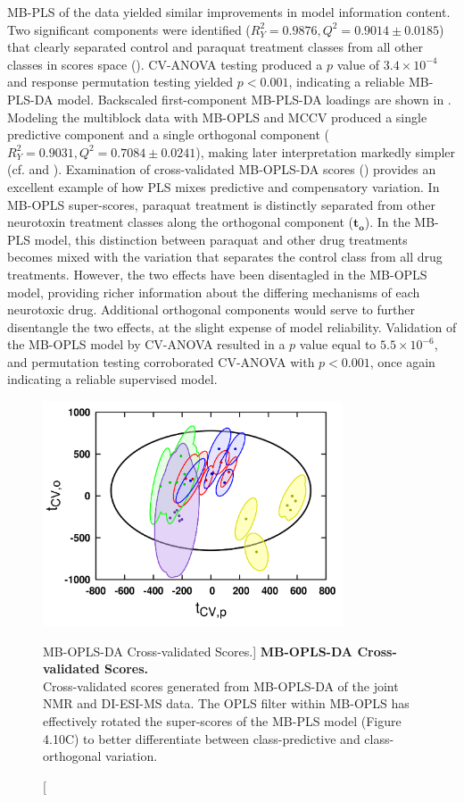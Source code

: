 \begin{doublespace}
MB-PLS of the data yielded similar improvements in model information content.
Two significant components were identified
($R^2_Y = 0.9876, Q^2 = 0.9014 \pm 0.0185$) that clearly separated control and
paraquat treatment classes from all other classes in scores space
(). CV-ANOVA testing produced a $p$ value
of $3.4 \times 10^{-4}$ and response permutation testing yielded
$p < 0.001$, indicating a reliable MB-PLS-DA model. Backscaled
first-component MB-PLS-DA loadings are shown in .
Modeling the multiblock data with MB-OPLS and MCCV produced a
single predictive component and a single orthogonal component
($R^2_Y = 0.9031, Q^2 = 0.7084 \pm 0.0241$), making later interpretation
markedly simpler (cf.  and ).
Examination of cross-validated MB-OPLS-DA scores
() provides an excellent example of how PLS mixes
predictive and compensatory variation. In MB-OPLS super-scores, paraquat
treatment is distinctly separated from other neurotoxin treatment classes along
the orthogonal component ($\mathbf{t_o}$). In the MB-PLS model, this
distinction between paraquat and other drug treatments becomes mixed with the
variation that separates the control class from all drug treatments. However,
the two effects have been disentagled in the MB-OPLS model, providing richer
information about the differing mechanisms of each neurotoxic drug. Additional
orthogonal components would serve to further disentangle the two effects, at
the slight expense of model reliability. Validation of the MB-OPLS model by
CV-ANOVA resulted in a $p$ value equal to $5.5 \times 10^{-6}$, and permutation
testing corroborated CV-ANOVA with $p < 0.001$, once again indicating a
reliable supervised model.
\end{doublespace}

\begin{figure}
\includegraphics[width=3.5in]{figs/apps/14-mbopls-t.png}
\caption
      [MB-OPLS-DA Cross-validated Scores.]{
  {\bf MB-OPLS-DA Cross-validated Scores.}
  \\
  Cross-validated scores generated from MB-OPLS-DA of the joint \hnmr{} NMR
  and DI-ESI-MS data. The OPLS filter within MB-OPLS has effectively rotated
  the super-scores of the MB-PLS model (Figure 4.10C) to better differentiate
  between class-predictive and class-orthogonal variation.
}
\label{figure.4.14}
\end{figure}

